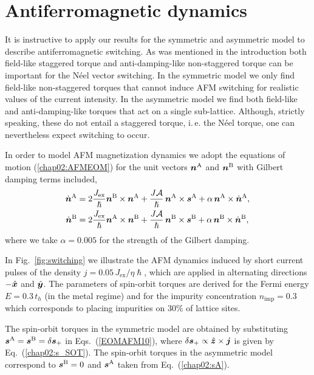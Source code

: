 \section{Antiferromagnetic dynamics}

It is instructive to apply our results for the symmetric and asymmetric model to describe antiferromagnetic switching. As was mentioned in the introduction both field-like staggered torque and anti-damping-like non-staggered torque can be important for the N\'eel vector switching. In the symmetric model we only find field-like non-staggered torques that cannot induce AFM switching for realistic values of the current intensity. In the asymmetric model we find both field-like and anti-damping-like torques that act on a single sub-lattice. Although, strictly speaking, these do not entail a staggered torque, i.\,e. the N\'eel torque, one can nevertheless expect switching to occur. 

In order to model AFM magnetization dynamics we adopt the equations of motion (\ref{chap02:AFMEOM}) for the unit vectors $\boldsymbol{n}^\text{A}$ and $\boldsymbol{n}^\text{B}$  with Gilbert damping terms included,
\beml
\label{EOMAFM10}
\begin{align}
\dot{\boldsymbol{n}}^\text{A} &= 2\frac{J_\text{ex}}{\hslash}\boldsymbol{n}^\text{B}\times \boldsymbol{n}^\text{A}+ \frac{J\mathcal{A}}{\hslash}\, \boldsymbol{n}^\text{A}\times \boldsymbol{s}^\text{A} +\alpha\, \boldsymbol{n}^\text{A}\times \dot{\boldsymbol{n}}^\text{A},\\
\dot{\boldsymbol{n}}^\text{B}&= 2\frac{J_\text{ex}}{\hslash} \boldsymbol{n}^\text{A}\times \boldsymbol{n}^\text{B}+ \frac{J\mathcal{A}}{\hslash}\, \boldsymbol{n}^\text{B}\times \boldsymbol{s}^\text{B}+\alpha\, \boldsymbol{n}^\text{B}\times \dot{\boldsymbol{n}}^\text{B},
\end{align}
\eml
where we take $\alpha=0.005$ for the strength of the Gilbert damping.  

In Fig.~\ref{fig:switching} we illustrate the AFM dynamics induced by short current pulses of the density $j=0.05\,J_\text{ex}/\eta\hslash$, which are applied in alternating directions $-\hat{\boldsymbol{x}}$ and $\hat{\boldsymbol{y}}$. The parameters of spin-orbit torques are derived for the Fermi energy $E =0.3\,t_h$ (in the metal regime) and for the impurity concentration $n_\text{imp}=0.3$ which corresponds to placing impurities on $30\%$ of lattice sites.   

The spin-orbit torques in the symmetric model are obtained by substituting $\boldsymbol{s}^\text{A}=\boldsymbol{s}^\text{B} = \delta\boldsymbol{s}_+$ in Eqs.~(\ref{EOMAFM10}), where $\delta\boldsymbol{s}_+ \propto \hat{\boldsymbol{z}}\times\boldsymbol{j}$ is given by Eq.~(\ref{chap02:s_SOT}). The spin-orbit torques in the asymmetric model correspond to $\boldsymbol{s}^\text{B}=0$ and $\boldsymbol{s}^\text{A}$ taken from Eq.~(\ref{chap02:sA}).
 
